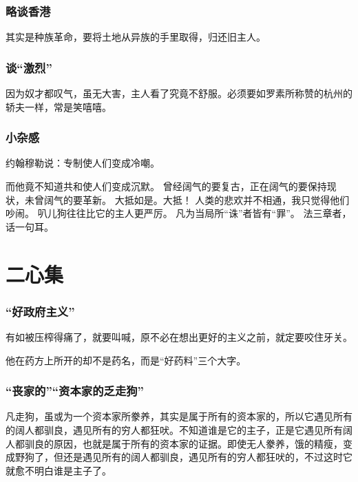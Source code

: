 \documentclass[a4paper]{article}
\begin{document}
\begin{sloppy}
        \section{
            略谈香港
        }
        其实是种族革命，要将土地从异族的手里取得，归还旧主人。

        \section{
            谈“激烈”
        }
        因为奴才都叹气，虽无大害，主人看了究竟不舒服。必须要如罗素所称赞的杭州的轿夫一样，常是笑嘻嘻。

        \section{
            小杂感
        }
        约翰穆勒说：专制使人们变成冷嘲。

        而他竟不知道共和使人们变成沉默。
        \vspace{1em}
        曾经阔气的要复古，正在阔气的要保持现状，未曾阔气的要革新。
        大抵如是。大抵！
        \vspace{1em}
        人类的悲欢并不相通，我只觉得他们吵闹。
        \vspace{1em}
        叭儿狗往往比它的主人更严厉。
        \vspace{1em}
        凡为当局所“诛”者皆有“罪”。
        \vspace{1em}
        法三章者，话一句耳。

        \part{二心集}


        \section{
            “好政府主义”
        }
        有如被压榨得痛了，就要叫喊，原不必在想出更好的主义之前，就定要咬住牙关。

        他在药方上所开的却不是药名，而是“好药料”三个大字。

        \section{
            “丧家的”“资本家的乏走狗”
        }
        凡走狗，虽或为一个资本家所豢养，其实是属于所有的资本家的，所以它遇见所有的阔人都驯良，遇见所有的穷人都狂吠。不知道谁是它的主子，正是它遇见所有阔人都驯良的原因，也就是属于所有的资本家的证据。即使无人豢养，饿的精瘦，变成野狗了，但还是遇见所有的阔人都驯良，遇见所有的穷人都狂吠的，不过这时它就愈不明白谁是主子了。


\end{sloppy}
\end{document}
